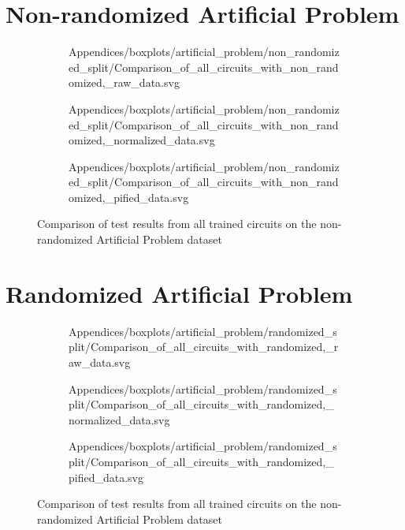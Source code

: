 \clearpage 
\section{Non-randomized Artificial Problem}
\label{chapter:artificial_problem_non_randomized}

\begin{figure}[!h]
    \begin{subfigure}{.5\textwidth}
        \centering
        
        {Appendices/boxplots/artificial_problem/non_randomized_split/Comparison_of_all_circuits_with_non_randomized,_raw_data.svg}
    \end{subfigure}
    \begin{subfigure}{.5\textwidth}
        \centering
        
        {Appendices/boxplots/artificial_problem/non_randomized_split/Comparison_of_all_circuits_with_non_randomized,_normalized_data.svg}
    \end{subfigure}
    \begin{subfigure}{.5\textwidth}
        \centering
        
        {Appendices/boxplots/artificial_problem/non_randomized_split/Comparison_of_all_circuits_with_non_randomized,_pified_data.svg}
    \end{subfigure}
    \caption{Comparison of test results from all trained circuits on the non-randomized Artificial Problem dataset}
    \label{fig:circuits_results_non_r_ap}
\end{figure}

\clearpage 
\section{Randomized Artificial Problem}
\label{chapter:artificial_problem_randomized}
\begin{figure}[!h]
    \begin{subfigure}{.5\textwidth}
        \centering
        
        {Appendices/boxplots/artificial_problem/randomized_split/Comparison_of_all_circuits_with_randomized,_raw_data.svg}
    \end{subfigure}
    \begin{subfigure}{.5\textwidth}
        \centering
        
        {Appendices/boxplots/artificial_problem/randomized_split/Comparison_of_all_circuits_with_randomized,_normalized_data.svg}
    \end{subfigure}
    \begin{subfigure}{.5\textwidth}
        \centering
        
        {Appendices/boxplots/artificial_problem/randomized_split/Comparison_of_all_circuits_with_randomized,_pified_data.svg}
    \end{subfigure}
    \caption{Comparison of test results from all trained circuits on the non-randomized Artificial Problem dataset}
    \label{fig:circuits_results_r_ap}
\end{figure}

